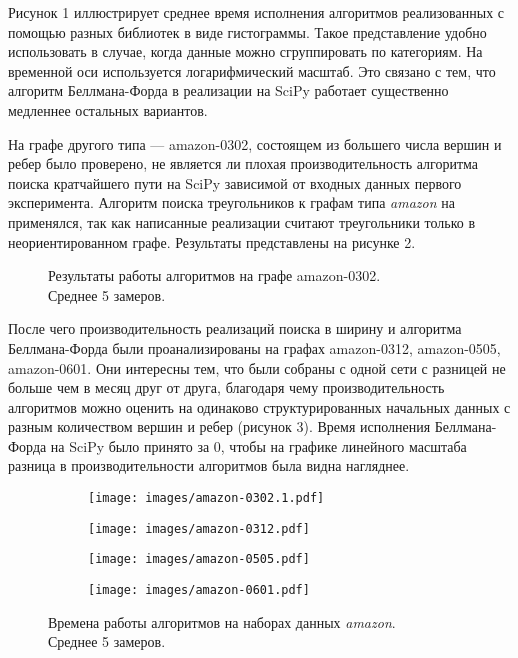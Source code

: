 Рисунок 1 иллюстрирует среднее время исполнения алгоритмов реализованных с помощью разных библиотек в виде гистограммы. 
Такое представление удобно использовать в случае, когда данные можно сгруппировать по категориям. На временной оси используется 
логарифмический масштаб. Это связано с тем, что алгоритм Беллмана-Форда в реализации на SciPy работает существенно медленнее 
остальных вариантов.

На графе другого типа --- amazon-0302, состоящем из большего числа вершин и ребер было проверено, не является ли плохая 
производительность алгоритма поиска кратчайшего пути на SciPy зависимой от входных данных первого эксперимента. Алгоритм 
поиска треугольников к графам типа \textit{amazon} на применялся, так как написанные реализации считают треугольники только 
в неориентированном графе. Результаты представлены на рисунке 2.

\begin{figure}[ht]
\begin{center}
\caption{\label{amazon-0302}Результаты работы алгоритмов на графе amazon-0302.\\Среднее 5 замеров.}
\end{center}
\end{figure}

После чего производительность реализаций поиска в ширину и алгоритма Беллмана-Форда были проанализированы на графах amazon-0312, 
amazon-0505, amazon-0601. Они интересны тем, что были собраны с одной сети с разницей не больше чем в месяц друг от друга, 
благодаря чему производительность алгоритмов можно оценить на одинаково структурированных начальных данных с разным количеством 
вершин и ребер (рисунок 3). Время исполнения Беллмана-Форда на SciPy было принято за 0, чтобы на графике линейного масштаба разница 
в производительности алгоритмов была видна нагляднее.

\begin{figure}[htp]
\centering
    \begin{subfigure}{0.5\textwidth}
        \texttt{[image: images/amazon-0302.1.pdf]}
    \end{subfigure}\hfill
    \begin{subfigure}{0.5\textwidth}
        \texttt{[image: images/amazon-0312.pdf]}
    \end{subfigure}\hfill
    \begin{subfigure}{0.5\textwidth}
        \texttt{[image: images/amazon-0505.pdf]}
    \end{subfigure}\hfill
    \begin{subfigure}{0.5\textwidth}
        \texttt{[image: images/amazon-0601.pdf]}
    \end{subfigure}\hfill
\caption{Времена работы алгоритмов на наборах данных \textit{amazon}.\\Среднее 5 замеров.}
\end{figure}

